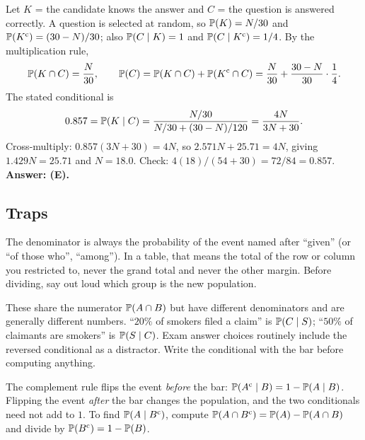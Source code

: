 \begin{solution}
Let $K$ = the candidate knows the answer and $C$ = the question is answered
correctly. A question is selected at random, so $\mathbb{P}(K) = N/30$ and
$\mathbb{P}(K^{\mathrm{c}}) = (30 - N)/30$; also $\mathbb{P}(C \mid K) = 1$ and
$\mathbb{P}(C \mid K^{\mathrm{c}}) = 1/4$. By the multiplication rule,
\[
\mathbb{P}(K \cap C) = \frac{N}{30}, \qquad
\mathbb{P}(C) = \mathbb{P}(K \cap C) + \mathbb{P}(K^{\mathrm{c}} \cap C)
= \frac{N}{30} + \frac{30 - N}{30}\cdot\frac{1}{4} .
\]
The stated conditional is
\[
0.857 = \mathbb{P}(K \mid C) = \frac{N/30}{N/30 + (30 - N)/120}
= \frac{4N}{3N + 30} .
\]
Cross-multiply: $0.857(3N + 30) = 4N$, so $2.571N + 25.71 = 4N$, giving
$1.429N = 25.71$ and $N = 18.0$. Check: $4(18)/(54 + 30) = 72/84 = 0.857$.
\textbf{Answer: (E).}
\end{solution}

\subsection{Traps}

\begin{trap}
The denominator is always the probability of the event named after ``given''
(or ``of those who'', ``among''). In a table, that means the total of the row
or column you restricted to, never the grand total and never the other
margin. Before dividing, say out loud which group is the new population.
\end{trap}

\begin{trap}
These share the numerator $\mathbb{P}(A \cap B)$ but have different denominators
and are generally different numbers. ``$20\%$ of smokers filed a claim'' is
$\mathbb{P}(C \mid S)$; ``$50\%$ of claimants are smokers'' is $\mathbb{P}(S \mid C)$.
Exam answer choices routinely include the reversed conditional as a
distractor. Write the conditional with the bar before computing anything.
\end{trap}

\begin{trap}
The complement rule flips the event \emph{before} the bar:
$\mathbb{P}(A^{\mathrm{c}} \mid B) = 1 - \mathbb{P}(A \mid B)$. Flipping the event \emph{after} the
bar changes the population, and the two conditionals need not add to $1$.
To find $\mathbb{P}(A \mid B^{\mathrm{c}})$, compute $\mathbb{P}(A \cap B^{\mathrm{c}}) = \mathbb{P}(A) - \mathbb{P}(A \cap B)$
and divide by $\mathbb{P}(B^{\mathrm{c}}) = 1 - \mathbb{P}(B)$.
\end{trap}

